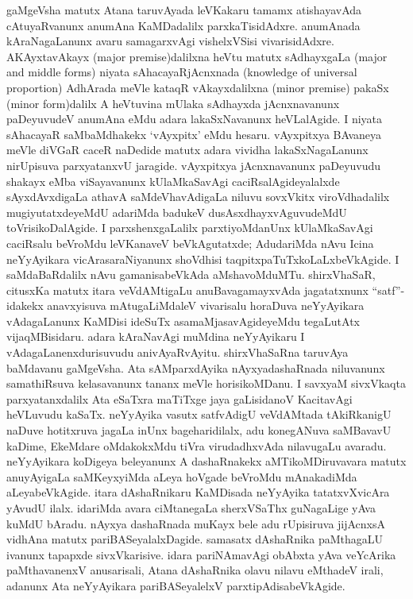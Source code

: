 gaMgeVsha matutx Atana taruvAyada leVKakaru tamamx atishayavAda cAtuyaR\-vanunx anumAna KaMDadalilx parxkaTisidAdxre. anumAnada kAraNagaLanunx avaru samagarxvAgi vishelxVSisi vivarisidAdxre. AKAyxtavAkayx ({\rm major premise})dalilxna heVtu matutx sAdhayxgaLa ({\rm major and middle forms}) niyata sAhacayaRjAcnxnada ({\rm knowledge of universal proportion}) AdhArada meVle kataqR vAkayxdalilxna ({\rm minor premise}) pakaSx ({\rm minor form})dalilx A heVtuvina mUlaka sAdhayxda jAcnxnavanunx paDeyuvudeV anumAna eMdu adara lakaSxNavanunx heVLalAgide. I niyata sAhacayaR saMbaMdhakekx `vAyxpitx' eMdu hesaru. vAyxpitxya BAvaneya meVle diVGaR caceR naDedide matutx adara vividha lakaSxNagaLanunx nirUpisuva parxyatanxvU jaragide. vAyxpitxya jAcnxnavanunx paDeyuvudu shakayx eMba viSayavanunx kUlaMkaSavAgi caciRsalAgideyalalxde sAyxdAvxdigaLa athavA saMdeVhavAdigaLa niluvu sovxVkitx viroVdhadalilx mugiyutatxdeyeMdU adariMda badukeV dusAsxdhayxvAguvudeMdU toVrisikoDalAgide. I parxshenxgaLalilx parxtiyoMdanUnx kUlaMkaSavAgi caciRsalu beVroMdu leVKanaveV beVkAgutatxde; AdudariMda nAvu Icina neYyAyikara vicArasaraNiyanunx shoVdhisi taqpitxpaTuTxkoLaLxbeVkAgide. I saMdaBaRdalilx nAvu gamanisabeVkAda aMshavoMduMTu. shirxVhaSaR, citusxKa matutx itara veVdAMtigaLu anuBavagamayxvAda jagatatxnunx ``satf''-idakekx anavxyisuva mAtugaLiMdaleV vivarisalu horaDuva neYyAyikara vAdagaLanunx KaMDisi ideSuTx asamaMjasavAgideyeMdu tegaLutAtx vijaqMBisidaru. adara kAraNavAgi muMdina neYyAyikaru I vAdagaLanenxdurisuvudu anivAyaRvAyitu. shirxVhaSaRna taruvAya baMdavanu gaMgeVsha. Ata sAMparxdAyika nAyxyadashaRnada niluvanunx samathiRsuva kelasavanunx tananx meVle horisikoMDanu. I savxyaM sivxVkaqta parxyatanxdalilx Ata eSaTxra maTiTxge jaya gaLisidanoV KacitavAgi heVLuvudu kaSaTx. neYyAyika vasutx satfvAdigU veVdAMtada tAkiRkanigU naDuve hotitxruva jagaLa inUnx bageharidilalx, adu konegANuva saMBavavU kaDime, EkeMdare oMdakokxMdu tiVra virudadhxvAda nilavugaLu avaradu. neYyAyikara koDigeya beleyanunx A dashaRnakekx aMTikoMDiruvavara matutx anuyAyigaLa saMKeyxyiMda aLeya hoVgade beVroMdu mAnakadiMda aLeyabeVkAgide. itara dAshaRnikaru KaMDisada neYyAyika tatatxvXvicAra yAvudU ilalx. idariMda avara ciMtanegaLa sherxVSaThx guNagaLige yAva kuMdU bAradu. nAyxya dashaRnada muKayx bele adu rUpisiruva jijAcnxsA vidhAna matutx pariBASeyalalxDagide. samasatx dAshaRnika paMthagaLU ivanunx tapapxde sivxVkarisive. idara pariNAmavAgi obAbxta yAva veYcArika paMthavanenxV anusarisali, Atana dAshaRnika olavu nilavu eMthadeV irali, adanunx Ata neYyAyikara pariBASeyalelxV parxtipAdisabeVkAgide.

